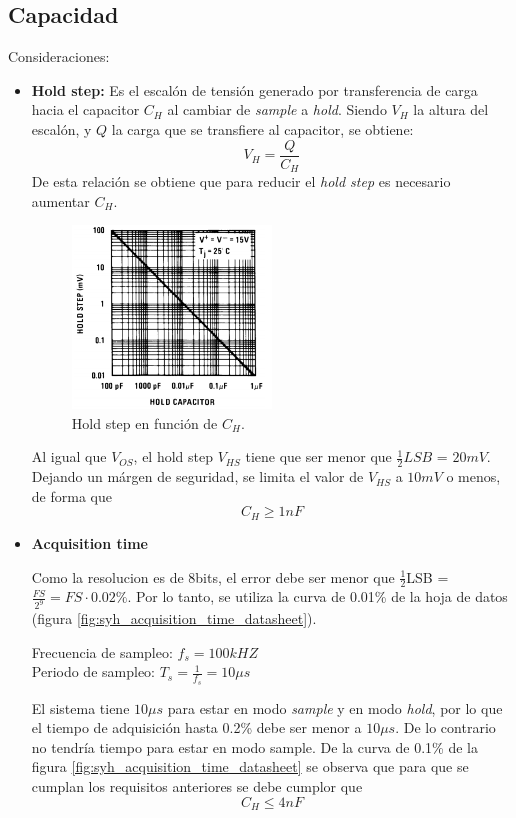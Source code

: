 \documentclass[../../ASSD_TP1_G7.tex]{subfiles}
\begin{document}
\subsection{Capacidad}
Consideraciones:
\begin{itemize}
	\item \textbf{Hold step:}
	Es el escal\'on de tensi\'on generado por transferencia de carga hacia el capacitor $C_H$ al cambiar de \textit{sample} a \textit{hold}. Siendo $V_H$ la altura del escal\'on, y $Q$ la carga que se transfiere al capacitor, se obtiene: 
	\[V_H = \frac{Q}{C_H}\]
	De esta relaci\'on se obtiene que para reducir el \textit{hold step} es necesario aumentar $C_H$.

		\begin{figure}[H]
			\centering
			\includegraphics[width = 0.5\textwidth]{figures/hold_step_datasheet.png}
			\caption{Hold step en funci\'on de $C_H$.}
			\label{fig:syh_hold_step_datasheet}
		\end{figure}

Al igual que $V_{OS}$, el hold step $V_{HS}$ tiene que ser menor que $\frac{1}{2} LSB$ = $20mV$. Dejando un m\'argen de seguridad, se limita el valor de $V_{HS}$ a $10mV$ o menos, de forma que \[ C_H \geqslant 1nF \]
	
	
	\item\textbf{Acquisition time}
	
Como la resolucion es de 8bits, el error debe ser menor que $\frac{1}{2}$LSB = $\frac{FS}{2^9} = FS \cdot 0.02\% $. Por lo tanto, se utiliza la curva de 0.01\% de la hoja de datos (figura \ref{fig:syh_acquisition_time_datasheet}).

Frecuencia de sampleo: $f_s = 100kHZ $ \\
Periodo de sampleo: $T_s = \frac{1}{f_s} = 10\mu s$


El sistema tiene $10\mu s$ para estar en modo \textit{sample} y en modo \textit{hold}, por lo que el tiempo de adquisici\'on hasta 0.2\% debe ser menor a $10\mu s$. De lo contrario no tendr\'ia tiempo para estar en modo sample. De la curva de 0.1\% de la figura \ref{fig:syh_acquisition_time_datasheet} se observa que para que se cumplan los requisitos anteriores se debe cumplor que \[C_H \leqslant 4nF\]


\end{itemize}
\end{document}
